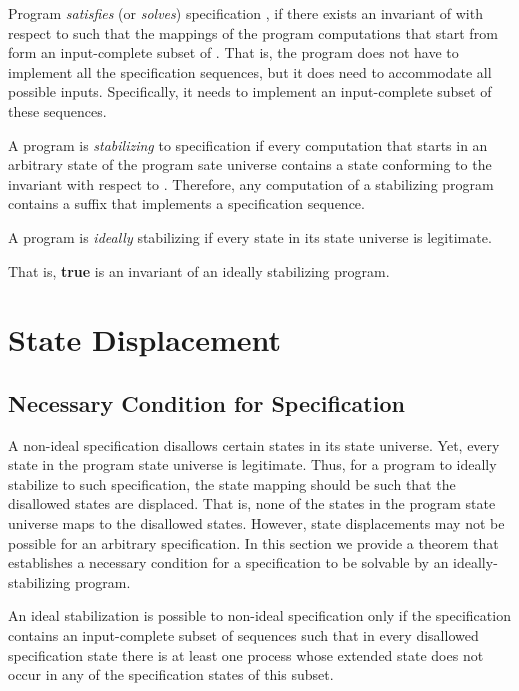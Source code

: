 \documentclass[11pt]{llncs}
\def\PROG#1{}
\begin{document}
Program \PROG{P} \emph{satisfies} (or \emph{solves}) specification
\PROG{S}, if there exists an invariant  of \PROG{P} with respect to
\PROG{S} such that the mappings of the program computations that start
from  form an input-complete subset of \PROG{S}. That is, the
program does not have to implement all the specification sequences,
but it does need to accommodate all possible inputs. Specifically, it
needs to implement an input-complete subset of these sequences.


A program \PROG{P} is \emph{stabilizing} to specification \PROG{S} if
every computation that starts in an arbitrary state of the program
sate universe contains a state conforming to the invariant with
respect to \PROG{S}. Therefore, any computation of a stabilizing
program contains a suffix that implements a specification sequence.

\begin{definition}
A program is \emph{ideally} stabilizing if every state in its state
universe is legitimate.
\end{definition}

That is, \textbf{true} is an invariant of an ideally stabilizing
program.

\section{State Displacement}\label{SecNonIdealSpec}

\subsection{Necessary Condition for Specification}

A non-ideal specification disallows certain states in its state
universe. Yet, every state in the program state universe is
legitimate. Thus, for a program to ideally stabilize to such
specification, the state mapping should be such that the disallowed
states are displaced. That is, none of the states in the program state
universe maps to the disallowed states. However, state displacements
may not be possible for an arbitrary specification. In this section we
provide a theorem that establishes a necessary condition for a
specification to be solvable by an ideally-stabilizing program.

\begin{theorem}\label{trmNoIdeal}
An ideal stabilization is possible to non-ideal specification only if
the specification contains an input-complete subset of sequences such
that in every disallowed specification state there is at least one
process whose extended state does not occur in any of the
specification states of this subset.
\end{theorem}
\end{document}

